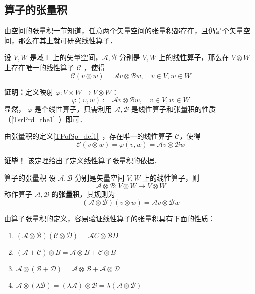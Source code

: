 
\subsection{算子的张量积}
由空间的张量积一节知道，任意两个矢量空间的张量积都存在，且仍是个矢量空间，那么在其上就可研究线性算子．
\begin{theorem}{}
设 $V,W$ 是域 $\mathbb F$ 上的矢量空间，$\mathcal A,\mathcal B$ 分别是 $V,W$ 上的线性算子，那么在 $V\otimes W$ 上存在唯一的线性算子 $\mathcal C$ ，使得
\begin{equation}\label{TPofLO_eq1}
\mathcal C(v\otimes w)=\mathcal A v\otimes \mathcal B w,\quad v\in V,w\in W
\end{equation}
\end{theorem}
\textbf{证明：}定义映射 $\varphi:V\times W\rightarrow V\otimes W$：
\begin{equation}
\varphi(v,w):=\mathcal A v\otimes \mathcal B w,\quad v\in V,w\in W
\end{equation}
显然， $\varphi$ 是个线性算子，只需利用 $\mathcal A,\mathcal B$ 是线性算子和张量积的性质（\autoref{TsrPrd_the1}~）即可．

由张量积的定义\autoref{TPofSp_def1}~，存在唯一的线性算子 $\mathcal C$，使得
\begin{equation}
\mathcal C(v\otimes w)=\varphi(v,w)=\mathcal A v\otimes \mathcal B w
\end{equation}

\textbf{证毕！}
该定理给出了定义线性算子张量积的依据．

\begin{definition}{算子的张量积}
设 $\mathcal A,\mathcal B$ 分别是矢量空间 $V,W$ 上的线性算子，则
\begin{equation}
\mathcal A\otimes \mathcal B:V\otimes W\rightarrow V\otimes W
\end{equation}
称作算子 $\mathcal A,\mathcal B$ 的\textbf{张量积}，其规则为
\begin{equation}
(\mathcal A\otimes \mathcal B)(v\otimes w)=\mathcal Av\otimes \mathcal Bw
\end{equation}
\end{definition}
由算子张量积的定义，容易验证线性算子的张量积具有下面的性质：
\begin{enumerate}
\item $(\mathcal A\otimes \mathcal B)(\mathcal C\otimes \mathcal D)=\mathcal AC\otimes \mathcal BD$
\item $(\mathcal A+\mathcal C)\otimes B=\mathcal A\otimes B+\mathcal C\otimes B$
\item $\mathcal A\otimes(\mathcal B+\mathcal D)=\mathcal A\otimes \mathcal B+\mathcal A\otimes \mathcal D$
\item $\mathcal A\otimes(\lambda\mathcal B)=(\lambda\mathcal A)\otimes \mathcal B=\lambda(\mathcal A\otimes \mathcal B)$
\end{enumerate}
